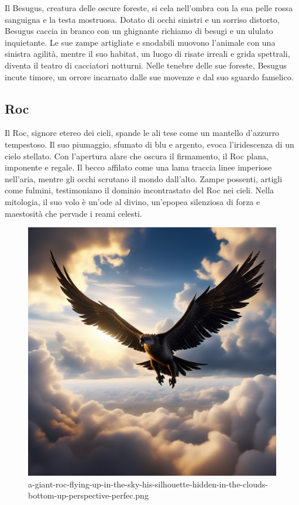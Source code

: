 Il Besugus, creatura delle oscure foreste, si cela nell'ombra con la sua
pelle rossa sanguigna e la testa mostruosa. Dotato di occhi sinistri e
un sorriso distorto, Besugus caccia in branco con un ghignante richiamo
di besugi e un ululato inquietante. Le sue zampe artigliate e snodabili
muovono l'animale con una sinistra agilità, mentre il suo habitat, un
luogo di risate irreali e grida spettrali, diventa il teatro di
cacciatori notturni. Nelle tenebre delle sue foreste, Besugus incute
timore, un orrore incarnato dalle sue movenze e dal suo sguardo
famelico.

\subsection{Roc}\label{roc}

Il Roc, signore etereo dei cieli, spande le ali tese come un mantello
d'azzurro tempestoso. Il suo piumaggio, sfumato di blu e argento, evoca
l'iridescenza di un cielo stellato. Con l'apertura alare che oscura il
firmamento, il Roc plana, imponente e regale. Il becco affilato come una
lama traccia linee imperiose nell'aria, mentre gli occhi scrutano il
mondo dall'alto. Zampe possenti, artigli come fulmini, testimoniano il
dominio incontrastato del Roc nei cieli. Nella mitologia, il suo volo è
un'ode al divino, un'epopea silenziosa di forza e maestosità che pervade
i reami celesti.

\begin{figure}
\centering
\includegraphics{a-giant-roc-flying-up-in-the-sky-his-silhouette-hidden-in-the-clouds-bottom-up-perspective-perfec.png}
\caption{a-giant-roc-flying-up-in-the-sky-his-silhouette-hidden-in-the-clouds-bottom-up-perspective-perfec.png}
\end{figure}

